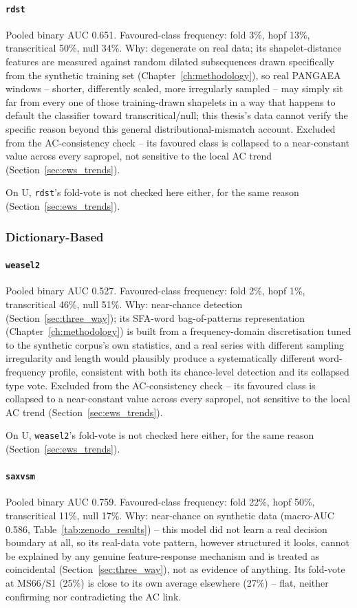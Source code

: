 \paragraph{\texttt{rdst}} Pooled binary AUC 0.651. Favoured-class frequency: fold 3\%, hopf 13\%, transcritical 50\%, null 34\%. Why: degenerate on real data; its shapelet-distance features are measured against random dilated subsequences drawn specifically from the synthetic training set (Chapter~\ref{ch:methodology}), so real PANGAEA windows -- shorter, differently scaled, more irregularly sampled -- may simply sit far from every one of those training-drawn shapelets in a way that happens to default the classifier toward transcritical/null; this thesis's data cannot verify the specific reason beyond this general distributional-mismatch account. Excluded from the AC-consistency check -- its favoured class is collapsed to a near-constant value across every sapropel, not sensitive to the local AC trend (Section~\ref{sec:ews_trends}).

On U, \texttt{rdst}'s fold-vote is not checked here either, for the same reason (Section~\ref{sec:ews_trends}).

\subsubsection{Dictionary-Based}
\paragraph{\texttt{weasel2}} Pooled binary AUC 0.527. Favoured-class frequency: fold 2\%, hopf 1\%, transcritical 46\%, null 51\%. Why: near-chance detection (Section~\ref{sec:three_way}); its SFA-word bag-of-patterns representation (Chapter~\ref{ch:methodology}) is built from a frequency-domain discretisation tuned to the synthetic corpus's own statistics, and a real series with different sampling irregularity and length would plausibly produce a systematically different word-frequency profile, consistent with both its chance-level detection and its collapsed type vote. Excluded from the AC-consistency check -- its favoured class is collapsed to a near-constant value across every sapropel, not sensitive to the local AC trend (Section~\ref{sec:ews_trends}).

On U, \texttt{weasel2}'s fold-vote is not checked here either, for the same reason (Section~\ref{sec:ews_trends}).

\paragraph{\texttt{saxvsm}} Pooled binary AUC 0.759. Favoured-class frequency: fold 22\%, hopf 50\%, transcritical 11\%, null 17\%. Why: near-chance on synthetic data (macro-AUC 0.586, Table~\ref{tab:zenodo_results}) -- this model did not learn a real decision boundary at all, so its real-data vote pattern, however structured it looks, cannot be explained by any genuine feature-response mechanism and is treated as coincidental (Section~\ref{sec:three_way}), not as evidence of anything. Its fold-vote at MS66/S1 (25\%) is close to its own average elsewhere (27\%) -- flat, neither confirming nor contradicting the AC link.

